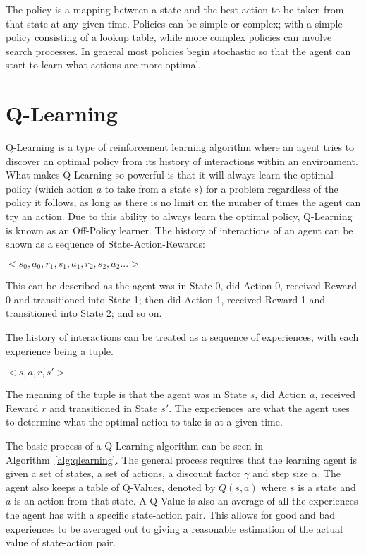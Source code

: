The policy is a mapping between a state and the best action to be taken from that state at any given time. Policies can be simple or complex; with a simple policy consisting of a lookup table, while more complex policies can involve search processes. In general most policies begin stochastic so that the agent can start to learn what actions are more optimal.~\cite{barto1998reinforcement}

\section{Q-Learning}\label{sec:qlearning}
Q-Learning is a type of reinforcement learning algorithm where an agent tries to discover an optimal policy from its history of interactions within an environment. What makes Q-Learning so powerful is that it will always learn the optimal policy (which action $a$ to take from a state $s$) for a problem regardless of the policy it follows, as long as there is no limit on the number of times the agent can try an action. Due to this ability to always learn the optimal policy, Q-Learning is known as an Off-Policy learner. The history of interactions of an agent can be shown as a sequence of State-Action-Rewards:
\begin{center}
$<s_{0},a_{0},r_{1},s_{1},a_{1},r_{2},s_{2},a_{2}...>$
\end{center}
This can be described as the agent was in State 0, did Action 0, received Reward 0 and transitioned into State 1; then did Action 1, received Reward 1 and transitioned into State 2; and so on.

The history of interactions can be treated as a sequence of experiences, with each experience being a tuple.
\begin{center}
$<s,a,r,s'>$
\end{center}
The meaning of the tuple is that the agent was in State $s$, did Action $a$, received Reward $r$ and transitioned in State $s'$.  The experiences are what the agent uses to determine what the optimal action to take is at a given time.

The basic process of a Q-Learning algorithm can be seen in Algorithm~\ref{alg:qlearning}. The general process requires that the learning agent is given a set of states, a set of actions, a discount factor $\gamma$ and step size $\alpha$. The agent also keeps a table of Q-Values, denoted by $Q(s,a)$ where $s$ is a state and $a$ is an action from that state. A Q-Value is also an average of all the experiences the agent has with a specific state-action pair. This allows for good and bad experiences to be averaged out to giving a reasonable estimation of the actual value of state-action pair. 

